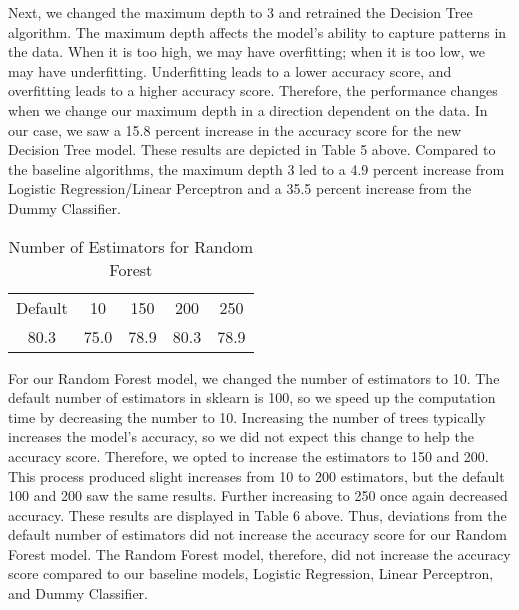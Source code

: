 \documentclass{article}
\begin{document}
Next, we changed the maximum depth to 3 and retrained the Decision Tree algorithm. The maximum depth affects the model's ability to capture patterns in the data. When it is too high, we may have overfitting; when it is too low, we may have underfitting. Underfitting leads to a lower accuracy score, and overfitting leads to a higher accuracy score. Therefore, the performance changes when we change our maximum depth in a direction dependent on the data. In our case, we saw a 15.8 percent increase in the accuracy score for the new Decision Tree model. These results are depicted in Table 5 above. Compared to the baseline algorithms, the maximum depth 3 led to a 4.9 percent increase from Logistic Regression/Linear Perceptron and a 35.5 percent increase from the Dummy Classifier. 

 \begin{table} [h]
    \centering
    \begin{tabular}{ccccc}
          Default& 10& 150& 200& 250\\
          80.3& 75.0& 78.9& 80.3& 78.9\\
    \end{tabular}
    \caption{Number of Estimators for Random Forest}
    \label{tab:my_label}
\end{table}
\FloatBarrier

For our Random Forest model, we changed the number of estimators to 10. The default number of estimators in sklearn is 100, so we speed up the computation time by decreasing the number to 10. Increasing the number of trees typically increases the model's accuracy, so we did not expect this change to help the accuracy score. Therefore, we opted to increase the estimators to 150 and 200. This process produced slight increases from 10 to 200 estimators, but the default 100 and 200 saw the same results. Further increasing to 250 once again decreased accuracy. These results are displayed in Table 6 above. Thus, deviations from the default number of estimators did not increase the accuracy score for our Random Forest model. The Random Forest model, therefore, did not increase the accuracy score compared to our baseline models, Logistic Regression, Linear Perceptron, and Dummy Classifier. 
\end{document}
